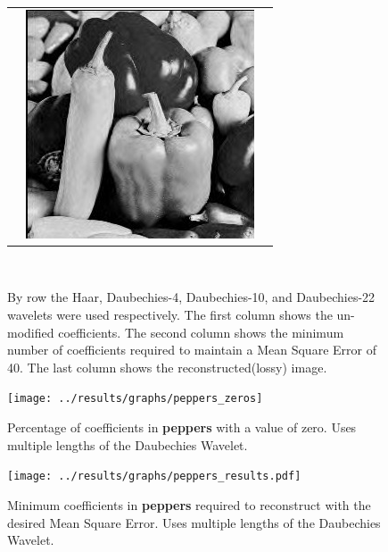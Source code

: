 \begin{figure}[hbt]
\begin{tabular}{ S @{} S @{} S }
		&	\includegraphics[height=0.25\textwidth]{../images/peppers_d22_final} \\
	\end{tabular} \\
	\caption{By row the Haar, Daubechies-4, Daubechies-10, and Daubechies-22 wavelets were used 
					 respectively. The first
					 column shows the un-modified coefficients.  The second column shows the minimum number
					 of coefficients required to maintain a Mean Square Error of 40.
					 The last column shows the reconstructed(lossy) image.}
\end{figure}

\begin{figure}[hbt]
	\centering
	\label{fig:peppers_zeros}
		\texttt{[image: ../results/graphs/peppers\_zeros]}
	\caption{Percentage of coefficients in {\bf peppers} with a value of zero. Uses multiple lengths of the Daubechies Wavelet. }
\end{figure}
\begin{figure}[hbt]
	\centering
	\label{fig:peppers_stats}
		\texttt{[image: ../results/graphs/peppers\_results.pdf]}
	\caption{Minimum coefficients in {\bf peppers} required to reconstruct with the desired Mean Square Error. Uses multiple lengths of the Daubechies Wavelet. }
\end{figure}





